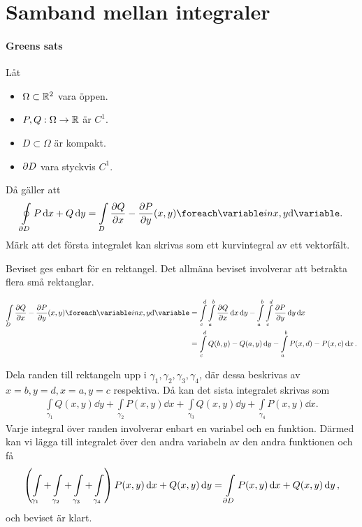 \section{Samband mellan integraler}

\paragraph{Greens sats}
Låt
\begin{itemize}
	\item $\Omega\subset\mathbb{R}^2$ vara öppen.
	\item $P, Q: \Omega\to\mathbb{R}$ är $C^1$.
	\item $D\subset\Omega$ är kompakt.
	\item $\partial D$ vara styckvis $C^1$.
\end{itemize}

Då gäller att
\begin{align*}
	\oint\limits_{\bound{D}}P\dd{x} + Q\dd{y} = \inteval{D}{\pdv{Q}{x} - \pdv{P}{y}}{{x, y}}.
\end{align*}
Märk att det första integralet kan skrivas som ett kurvintegral av ett vektorfält.

\proof
Beviset ges enbart för en rektangel. Det allmäna beviset involverar att betrakta flera små rektanglar.

\begin{align*}
	\inteval{D}{\pdv{Q}{x} - \pdv{P}{y}}{{x, y}} &= \int\limits_{c}^{d}\int\limits_{a}^{b}\pdv{Q}{x}(x, y)\dd{x}\dd{y} - \int\limits_{a}^{b}\int\limits_{c}^{d}\pdv{P}{y}(x, y)\dd{y}\dd{x} \\
	                                           &= \int\limits_{c}^{d}Q(b, y) - Q(a, y)\dd{y} - \int\limits_{a}^{b}P(x, d) - P(x, c)\dd{x}.
\end{align*}

Dela randen till rektangeln upp i $\gamma_1, \gamma_2, \gamma_3, \gamma_4$, där dessa beskrivas av $x = b, y = d, x = a, y = c$ respektiva. Då kan det sista integralet skrivas som
\begin{align*}
	  \int\limits_{\gamma_1}Q(x, y)\dd{y} + \int\limits_{\gamma_2}P(x, y)\dd{x} + \int\limits_{\gamma_3}Q(x, y)\dd{y} + \int\limits_{\gamma_4}P(x, y)\dd{x}.
\end{align*}	  
Varje integral över randen involverar enbart en variabel och en funktion. Därmed kan vi lägga till integralet över den andra variabeln av den andra funktionen och få
\begin{align*}
	\left(\int\limits_{\gamma_1} + \int\limits_{\gamma_2} + \int\limits_{\gamma_3} + \int\limits_{\gamma_4}\right)P(x, y)\dd{x} + Q(x, y)\dd{y} = \int\limits_{\partial D}P(x, y)\dd{x} + Q(x, y)\dd{y},
\end{align*}
och beviset är klart.

